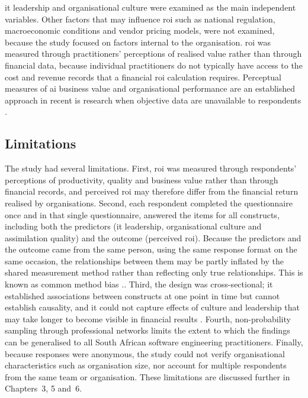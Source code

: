 \gls{it} leadership and organisational culture were examined as the main independent variables. Other factors that may influence \gls{roi} such as national regulation, macroeconomic conditions and vendor pricing models, were not examined, because the study focused on factors internal to the organisation. \gls{roi} was measured through practitioners' perceptions of realised value rather than through financial data, because individual practitioners do not typically have access to the cost and revenue records that a financial \gls{roi} calculation requires. Perceptual measures of \gls{ai} business value and organisational performance are an established approach in recent \gls{is} research when objective data are unavailable to respondents \parencite{Mikalef2021, FossoWamba2024, AbdulWahab2024}.

\subsection{Limitations}
\label{subsec:ch1-limitations}

The study had several limitations. First, \gls{roi} was measured through respondents'
 perceptions of productivity, quality and business value rather than through financial records, and perceived \gls{roi} may therefore differ from the financial return realised by organisations. Second, each respondent completed the questionnaire once and in that single questionnaire, answered the items for all constructs, including both the predictors (\gls{it} leadership, organisational culture and assimilation quality) and the outcome (perceived \gls{roi}). Because the predictors and the outcome came from the same person, using the same response format on the same occasion, the relationships between them may be partly inflated by the shared measurement method rather than reflecting only true relationships. This is known as common method bias  \parencite{Podsakoff2024}.. Third, the design was cross-sectional; it established associations between constructs at one point in time but cannot establish causality, and it could not capture effects of culture and leadership that may take longer to become visible in financial results \parencite{Brynjolfsson2021}. Fourth, non-probability sampling through professional networks limits the extent to which the findings can be generalised to all South African software engineering practitioners. Finally, because responses were anonymous, the study could not verify organisational characteristics such as organisation size, nor account for multiple respondents from the same team or organisation. These limitations are discussed further in Chapters~3, 5 and~6.

